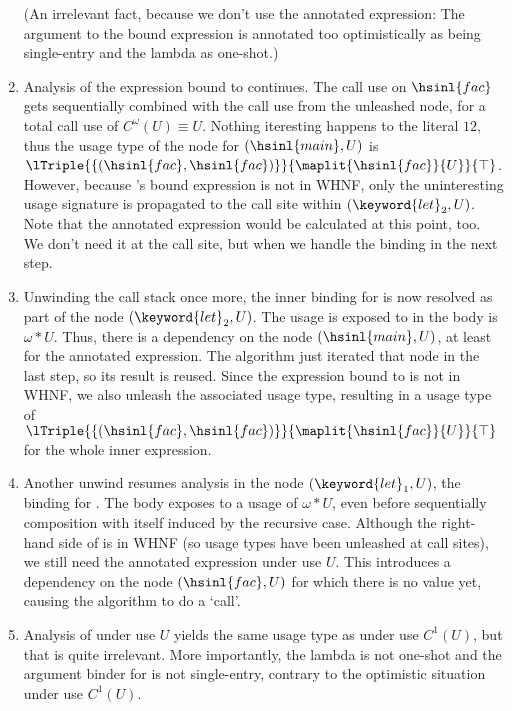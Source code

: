 \begin{example}
\begin{enumerate}
      (An irrelevant fact, because we don't use the annotated expression: The argument to the bound expression is annotated too optimistically as being single-entry and the lambda as one-shot.)
    \item
      Analysis of the expression bound to  continues.
      The call use on $\hsinl{fac}$ gets sequentially combined with the call use from the unleashed  node, for a total call use of $C^\omega(U) \equiv U$.
      Nothing iteresting happens to the literal $12$, thus the usage type of the  node for $(\hsinl{main}, U)$ is $\lTriple{\{(\hsinl{fac}, \hsinl{fac})\}}{\maplit{\hsinl{fac}}{U}}{\top}$.
      However, because 's bound expression is not in WHNF, only the uninteresting usage signature is propagated to the call site within $(\keyword{let}_2, U)$.
      Note that the annotated expression would be calculated at this point, too. 
      We don't need it at the call site, but when we handle the  binding in the next step.
    \item
      Unwinding the call stack once more, the inner  binding for  is now resolved as part of the  node $(\keyword{let}_2, U)$.
      The usage  is exposed to in the body is $\omega*U$.
      Thus, there is a dependency on the  node $(\hsinl{main},U)$, at least for the annotated expression.
      The algorithm just iterated that node in the last step, so its result is reused.
      Since the expression bound to  is not in WHNF, we also unleash the associated usage type, resulting in a usage type of $\lTriple{\{(\hsinl{fac}, \hsinl{fac})\}}{\maplit{\hsinl{fac}}{U}}{\top}$ for the whole inner  expression.
    \item
      Another unwind resumes analysis in the  node $(\keyword{let}_1, U)$, the binding for .
      The body exposes  to a usage of $\omega*U$, even before sequentially composition with itself induced by the recursive  case.
      Although the right-hand side of  is in WHNF (so usage types have been unleashed at call sites), we still need the annotated expression under use $U$.
      This introduces a dependency on the  node $(\hsinl{fac}, U)$ for which there is no value yet, causing the algorithm to do a `call'.
    \item
      Analysis of  under use $U$ yields the same usage type as under use $C^1(U)$, but that is quite irrelevant.
      More importantly, the lambda is not one-shot and the argument binder for  is not single-entry, contrary to the optimistic situation under use $C^1(U)$.

\end{enumerate}
\end{example}
